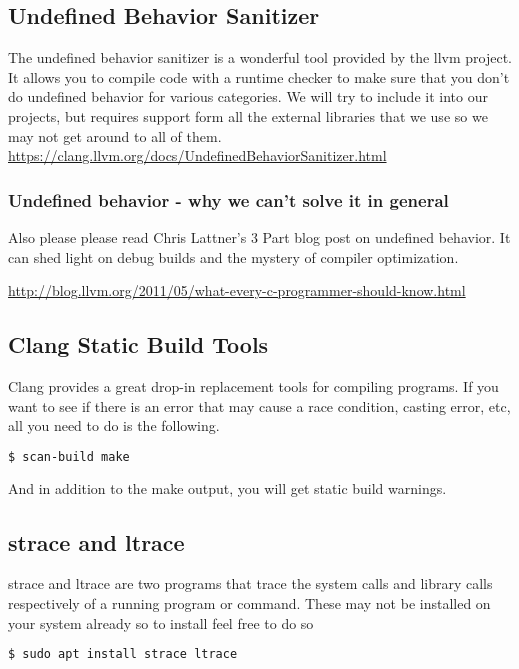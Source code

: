 \subsection{Undefined Behavior Sanitizer}

The undefined behavior sanitizer is a wonderful tool provided by the llvm project.
It allows you to compile code with a runtime checker to make sure that you don't do undefined behavior for various categories.
We will try to include it into our projects, but requires support form all the external libraries that we use so we may not get around to all of them.
\url{https://clang.llvm.org/docs/UndefinedBehaviorSanitizer.html}

\subsubsection{Undefined behavior - why we can't solve it in general}

Also please please read Chris Lattner's 3 Part blog post on undefined behavior. It can shed light on debug builds and the mystery of compiler optimization.

\url{http://blog.llvm.org/2011/05/what-every-c-programmer-should-know.html}


\subsection{Clang Static Build Tools}

Clang provides a great drop-in replacement tools for compiling programs.
If you want to see if there is an error that may cause a race condition, casting error, etc, all you need to do is the following.

\begin{lstlisting}[language=bash]
$ scan-build make
\end{lstlisting}

And in addition to the make output, you will get static build warnings.

\subsection{strace and ltrace}

strace and ltrace are two programs that trace the system calls and library calls respectively of a running program or command.
These may not be installed on your system already so to install feel free to do so

\begin{lstlisting}[language=bash]
$ sudo apt install strace ltrace
\end{lstlisting}

